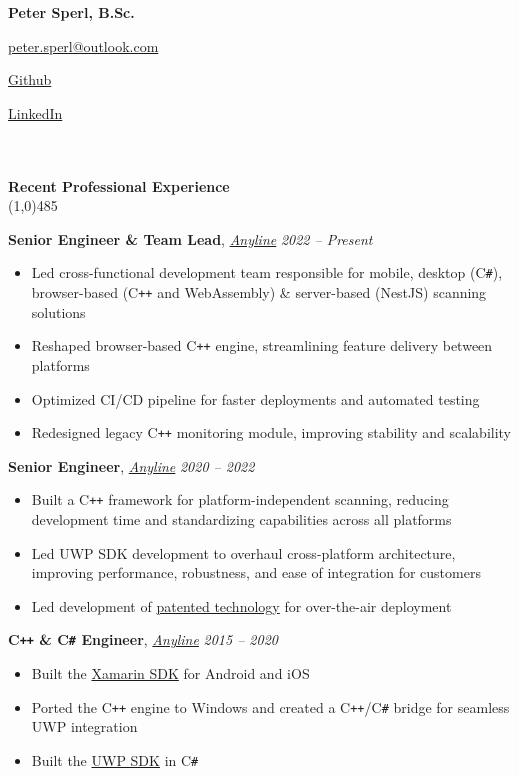 \documentclass[9pt]{extarticle}
\newcommand\negativespace[1][-0.12cm]{\hspace*{#1}}
\begin{document}
\centerline{{\LARGE \bf Peter Sperl, B.Sc.}}
\centerline{\href{mailto:peter.sperl@outlook.com}{peter.sperl@outlook.com}}
\centerline{\href{https://github.com/leorean}{Github}}
\centerline{\href{https://www.linkedin.com/in/peter-sperl}{LinkedIn}}


\noindent %
\\\\
\vspace*{-6pt}
{\negativespace \Large \bf Recent Professional Experience}\\
\line(1,0){485}
\\
\noindent

\noindent
{\bf Senior Engineer \& Team Lead}, \textit{\href{https://anyline.com}{Anyline}} \hfill \textit{2022 -- Present}
\begin{itemize}
\setlength\itemsep{0.05em}
\item Led cross-functional development team responsible for mobile, desktop (C\texttt{\#}), browser-based (C\texttt{++} and WebAssembly) \& server-based (NestJS) scanning solutions
\item Reshaped browser-based C\texttt{++} engine, streamlining feature delivery between platforms
\item Optimized CI/CD pipeline for faster deployments and automated testing
\item Redesigned legacy C\texttt{++} monitoring module, improving stability and scalability
\end{itemize}


\noindent
{\bf Senior Engineer}, \textit{\href{https://anyline.com}{Anyline}} \hfill \textit{2020 -- 2022} 
\begin{itemize}
\setlength\itemsep{0.05em} 
\item Built a C\texttt{++} framework for platform-independent scanning, reducing development time and standardizing capabilities across all platforms
\item Led UWP SDK development to overhaul cross-platform architecture, improving performance, robustness, and ease of integration for customers
\item Led development of \href{https://anyline.com/news/rapid-ai-with-closed-loop-training}{patented technology} for over-the-air deployment
\end{itemize}

\noindent
{\bf C\texttt{++} \& C\texttt{\#} Engineer}, \textit{\href{https://anyline.com}{Anyline}} \hfill \textit{2015 -- 2020}
\begin{itemize}
\setlength\itemsep{0.05em}
\item Built the \href{https://github.com/Anyline/anyline-ocr-xamarin-module}{Xamarin SDK} for Android and iOS
\item Ported the C\texttt{++} engine to Windows and created a C\texttt{++}/C\texttt{\#} bridge for seamless UWP integration
\item Built the \href{https://github.com/Anyline/anyline-ocr-examples-windows-uwp}{UWP SDK} in C\texttt{\#}
\end{itemize}
\end{document}
